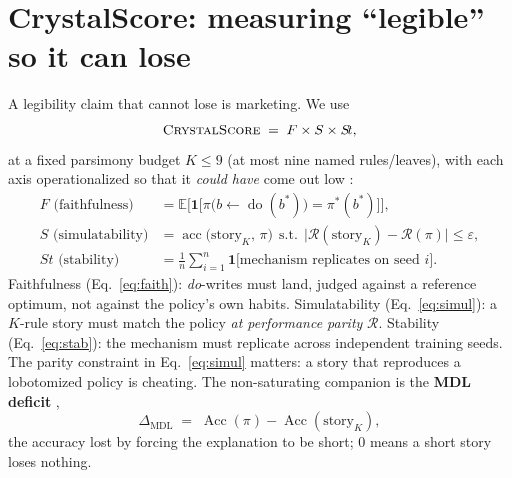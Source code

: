 \documentclass[11pt]{article}
\newcommand{\E}{\mathbb{E}}
\newcommand{\ind}{\mathbf{1}}
\begin{document}
\section{CrystalScore: measuring ``legible'' so it can lose}
\label{sec:metrics}

A legibility claim that cannot lose is marketing. We use
\begin{equation}
\textsc{CrystalScore} \;=\; F \times S \times S\!t,
\label{eq:cs}
\end{equation}
at a fixed parsimony budget $K \le 9$ (at most nine named rules/leaves), with each axis
operationalized so that it \emph{could have} come out low
\citep{doshivelez2017,jacovi2020,lipton2018}:
\begin{align}
F \text{ (faithfulness)} &= \E\Big[\ind\big[\pi\big(b \leftarrow \operatorname{do}(b^{*})\big)
= \pi^{*}(b^{*})\big]\Big],
\label{eq:faith}\\[3pt]
S \text{ (simulatability)} &= \operatorname{acc}\big(\text{story}_{K},\, \pi\big)
\ \ \text{s.t.}\ \ \big|\mathcal{R}(\text{story}_K) - \mathcal{R}(\pi)\big| \le \varepsilon,
\label{eq:simul}\\[3pt]
S\!t \text{ (stability)} &= \frac{1}{n}\sum_{i=1}^{n}
\ind\big[\text{mechanism replicates on seed } i\big].
\label{eq:stab}
\end{align}
Faithfulness (Eq.~\ref{eq:faith}): \emph{do}-writes must land, judged against a reference
optimum, not against the policy's own habits. Simulatability (Eq.~\ref{eq:simul}): a $K$-rule
story must match the policy \emph{at performance parity} $\mathcal{R}$. Stability
(Eq.~\ref{eq:stab}): the mechanism must replicate across independent training seeds.
The parity constraint in Eq.~\ref{eq:simul} matters: a story that reproduces a lobotomized
policy is cheating. The non-saturating companion is the \textbf{MDL deficit}
\citep{rissanen1978},
\begin{equation}
\Delta_{\text{MDL}} \;=\; \operatorname{Acc}(\pi) - \operatorname{Acc}(\text{story}_{K}),
\label{eq:mdl}
\end{equation}
the accuracy lost by forcing the explanation to be short; $0$ means a short story loses
nothing.
\end{document}
